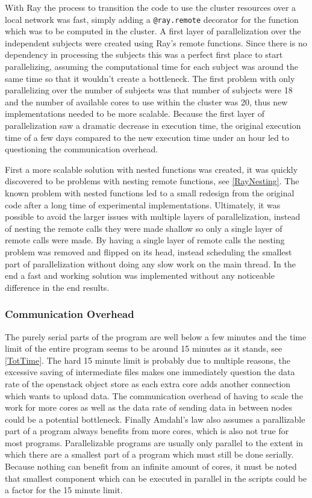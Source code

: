 \documentclass[12pt, a4paper]{article}
\begin{document}
With Ray the process to transition the code to use the cluster resources over a local network was fast, simply adding a \texttt{@ray.remote} decorator for the function which was to be computed in the cluster.
A first layer of parallelization over the independent subjects were created using Ray's remote functions.
Since there is no dependency in processing the subjects this was a perfect first place to start parallelizing, assuming the computational time for each subject was around the same time so that it wouldn't create a bottleneck.
The first problem with only parallelizing over the number of subjects was that number of subjects were 18 and the number of available cores to use within the cluster was 20, thus new implementations needed to be more scalable.
Because the first layer of parallelization saw a dramatic decrease in execution time, the original execution time of a few days compared to the new execution time under an hour led to questioning the communication overhead.

First a more scalable solution with nested functions was created, it was quickly discovered to be problems with nesting remote functions, see \cref{RayNesting}.
The known problem with nested functions led to a small redesign from the original code after a long time of experimental implementations. 
Ultimately, it was possible to avoid the larger issues with multiple layers of parallelization, instead of nesting the remote calls they were made shallow so only a single layer of remote calls were made.
By having a single layer of remote calls the nesting problem was removed and flipped on its head, instead scheduling the smallest part of parallelization without doing any slow work on the main thread.
In the end a fast and working solution was implemented without any noticeable difference in the end results.

\subsubsection{Communication Overhead}

The purely serial parts of the program are well below a few minutes and the time limit of the entire program seems to be around 15 minutes as it stands, see \cref{TotTime}.
The hard 15 minute limit is probably due to multiple reasons, the excessive saving of intermediate files makes one immediately question the data rate of the openstack object store as each extra core adds another connection which wants to upload data. 
The communication overhead of having to scale the work for more cores as well as the data rate of sending data in between nodes could be a potential bottleneck.
Finally Amdahl's law also assumes a parallizable part of a program always benefits from more cores, which is also not true for most programs.
Parallelizable programs are usually only parallel to the extent in which there are a smallest part of a program which must still be done serially.
Because nothing can benefit from an infinite amount of cores, it must be noted that smallest component which can be executed in parallel in the scripts could be a factor for the 15 minute limit.
\end{document}
